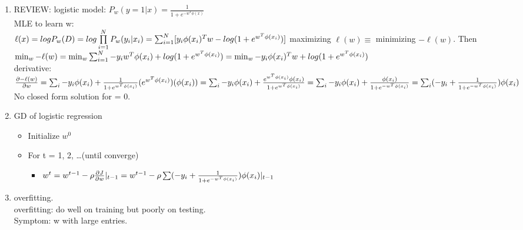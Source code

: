 \documentclass[12pt]{article}
\begin{document}
        \begin{enumerate}
            \item REVIEW:
            logistic model: $P_w(y = 1 | x) = \frac{1}{1 + e^{-w^T\phi(x)}}$\\
            MLE to learn w: \\
            $\ell(x) = logP_w(D) = log \prod \limits_{i=1}^NP_w(y_i|x_i)\\
            = \sum_{i =1}^N[y_i\phi(x_i)^Tw - log(1 + e^{w^T\phi(x_i)})]$
            maximizing $\ell(w) \equiv$ minimizing $-\ell(w)$.
            Then $\min_w -\ell(w) \\
            = \min_w \sum_{i = 1}^{N}-y_iw^T\phi(x_i) + log(1 + e^{w^T\phi(x_i)})\\
            =\min_w -y_i\phi(x_i)^Tw + log(1 + e^{w^T\phi(x_i)})$\\
            derivative:\\
            $\frac{\partial -\ell(w)}{\partial w} = \sum_i -y_i\phi(x_i) + \frac{1}{1 + e^{w^T\phi(x_i)}}(e^{w^T\phi(x_i)})(\phi(x_i))\\
            = \sum_i -y_i\phi(x_i) + \frac{e^{w^T\phi(x_i)}\phi(x_i)}{1 + e^{w^T\phi(x_i)}}\\
            = \sum_i -y_i\phi(x_i) + \frac{\phi(x_i)}{1 + e^{-w^T\phi(x_i)}}\\
            = \sum_i (-y_i + \frac{1}{1 + e^{-w^T\phi(x_i)}})\phi(x_i)$\\
            No closed form solution for = 0.
            \item GD of logistic regression
            \begin{itemize}
                \item Initialize $w^0$
                \item For t = 1, 2, \dots (until converge)
                \begin{itemize}
                    \item $w^t = w^{t-1} -\rho \frac{\partial J}{\partial w} |_{t-1}\\
                    = w^{t-1} -\rho \sum (-y_i + \frac{1}{1 + e^{-w^T\phi(x_i)}})\phi(x_i)|_{t-1}$
                \end{itemize}
            \end{itemize}

            \item overfitting.\\
            overfitting: do well on training but poorly on testing.\\
            Symptom: w with large entries.
            

\end{enumerate}
\end{document}
